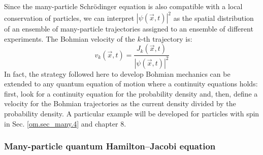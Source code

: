 \documentclass[nofootinbib, secnumarabic, amsmath, nobibnotes,10pt,aps,pra]{revtex4-1}
\newcommand{\sref}[1]{Sec. \ref{#1}}
\begin{document}
Since the many-particle Schr\"odinger equation is also compatible with a local conservation of particles, we can interpret $|\psi(\vec{x},t)|^2$ as the spatial distribution of an ensemble of many-particle trajectories assigned to an ensemble of different experiments. The Bohmian velocity of the $k$-th trajectory is:
\begin{equation}
\label{om.velocityND}
v_k(\vec{x},t) = \frac{J_k(\vec{x},t)} {|\psi(\vec{x},t)|^2}
\end{equation}
In fact, the strategy followed here to develop Bohmian mechanics can be extended to any quantum equation of motion where a continuity equations holds: first, look for a continuity equation for the probability density and, then, define a velocity for the Bohmian trajectories as the current density divided by the probability density.
A particular example will be developed for particles with spin in \sref{om.sec_many.4} and chapter 8.

\subsubsection{Many-particle quantum Hamilton--Jacobi equation}
\end{document}
